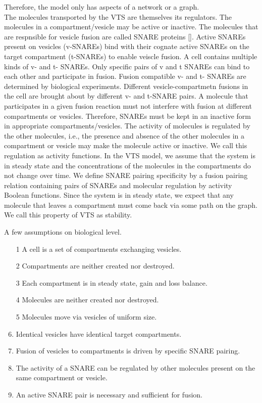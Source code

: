 

%
Therefore, the model only has aspects of a network or a graph.\\

The molecules transported by the VTS are themselves its regulators. The molecules in a
compartment/vesicle may be active or inactive. The molecules that are respnsible for vesicle fusion
are called SNARE proteins []. Active SNAREs present on vesicles (v-SNAREs) bind with their
cognate active SNAREs on the target compartment (t-SNAREs) to enable veiscle fusion. A cell
contains multiple kinds of v- and t- SNAREs. Only specific pairs of v and t SNAREs can bind to
each other and participate in fusion. Fusion compatible v- and t- SNAREs are determined by
biological experiments. Different vesicle-compartmetn fusions in the cell are brought about by
different v- and t-SNARE pairs. A molecule that participates in a given fusion reaction must not
interfere with fusion at different compartments or vesicles. Therefore, SNAREs must be kept in an
inactive form in appropriate compartments/vesicles. The activity of molecules is regulated by the
other molecules, i.e., the presence and absence of the other molecules in a compartment or vesicle
may make the molecule active or inactive. We call this regulation as activity functions.
In the VTS model, we assume that the system is in steady state and the concentrations of the
molecules in the compartments do not change over time. We define SNARE pairing specificity by a
fusion pairing relation containing pairs of SNAREs and molecular regulation by activity Boolean
functions. Since the system is in steady state, we expect that any molecule that leaves a
compartment must come back via some path on the graph. We call this property of VTS as stability.

A few assumptions on biological level.

\begin{enumerate}
\item[1] A cell is a set of compartments exchanging vesicles.
\item[2] Compartments are neither created nor destroyed.
\item[3] Each compartment is in steady state, gain and loss balance.
\item[4] Molecules are neither created nor destroyed.
\item[5] Molecules move via vesicles of uniform size.
\item Identical vesicles have identical target compartments.
\item Fusion of vesicles to compartments is driven by specific SNARE pairing.
\item The activity of a SNARE can be regulated by other molecules present on the same compartment
or vesicle.
\item An active SNARE pair is necessary and sufficient for fusion. 
 \end{enumerate}



